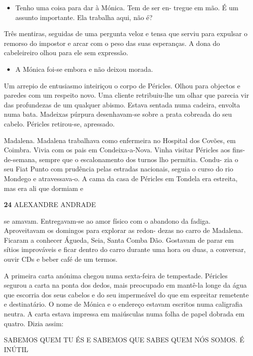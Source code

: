 \begin{itemize}
\tightlist
\item
  Tenho uma coisa para dar à Mónica. Tem de ser en- tregue em mão. É um
  assunto importante. Ela trabalha aqui, não é?
\end{itemize}

Três mentiras, seguidas de uma pergunta veloz e tensa que serviu para
expulsar o remorso do impostor e arcar com o peso das suas esperanças. A
dona do cabeleireiro olhou para ele sem expressão.

\begin{itemize}
\tightlist
\item
  A Mónica foi-se embora e não deixou morada.
\end{itemize}

Um arrepio de entusiasmo inteiriçou o corpo de Péricles. Olhou para
objectos e paredes com um respeito novo. Uma cliente retribuiu-lhe um
olhar que parecia vir das profundezas de um qualquer abismo. Estava
sentada numa cadeira, envolta numa bata. Madeixas púrpura desenhavam-se
sobre a prata cobreada do seu cabelo. Péricles retirou-se, apressado.

Madalena. Madalena trabalhava como enfermeira no Hospital dos Covões, em
Coimbra. Vivia com os pais em Condeixa-a-Nova. Vinha visitar Péricles
aos fins-de-semana, sempre que o escalonamento dos turnos lho permitia.
Condu- zia o seu Fiat Punto com prudência pelas estradas nacionais,
seguia o curso do rio Mondego e atravessava-o. A cama da casa de
Péricles em Tondela era estreita, mas era ali que dormiam e

\textbf{24 }ALEXANDRE ANDRADE

se amavam. Entregavam-se ao amor físico com o abandono da fadiga.
Aproveitavam os domingos para explorar as redon- dezas no carro de
Madalena. Ficaram a conhecer Águeda, Seia, Santa Comba Dão. Gostavam de
parar em sítios improváveis e ficar dentro do carro durante uma hora ou
duas, a conversar, ouvir CDs e beber café de um termos.

A primeira carta anónima chegou numa sexta-feira de tempestade. Péricles
segurou a carta na ponta dos dedos, mais preocupado em mantê-la longe da
água que escorria dos seus cabelos e do seu impermeável do que em
espreitar remetente e destinatário. O nome de Mónica e o endereço
estavam escritos numa caligrafia neutra. A carta estava impressa em
maiúsculas numa folha de papel dobrada em quatro. Dizia assim:

SABEMOS QUEM TU ÉS E SABEMOS QUE SABES QUEM NÓS SOMOS. É INÚTIL

